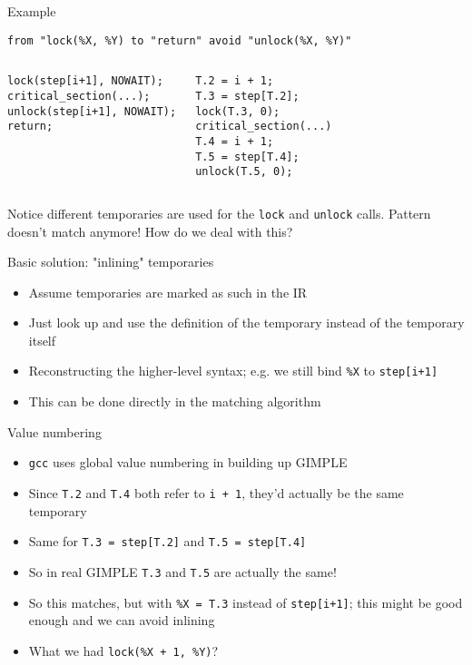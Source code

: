 \documentclass{beamer}
\begin{document}
\begin{frame}[fragile]{Example}

{\tt from "lock(\%X, \%Y) to "return" avoid "unlock(\%X, \%Y)"}

\begin{columns}
\column{2in}
\begin{verbatim}
lock(step[i+1], NOWAIT);
critical_section(...);
unlock(step[i+1], NOWAIT);
return;
\end{verbatim}
\column{2in}
\begin{verbatim}
T.2 = i + 1;
T.3 = step[T.2];
lock(T.3, 0);
critical_section(...)
T.4 = i + 1;
T.5 = step[T.4];
unlock(T.5, 0);
\end{verbatim}
\end{columns}
\vspace{10mm}
Notice different temporaries are used for the {\tt lock} and {\tt unlock} calls. Pattern doesn't match anymore! How do we deal with this?
\end{frame} 

\begin{frame}{Basic solution: "inlining" temporaries}
\begin{itemize}
\item Assume temporaries are marked as such in the IR
\item Just look up and use the definition of the temporary instead of the
temporary itself
\item Reconstructing the higher-level syntax; e.g. we still bind {\tt \%X}
to {\tt step[i+1]}
\item This can be done directly in the matching algorithm
\end{itemize}
\end{frame}

\begin{frame}{Value numbering}
\begin{itemize}
\item {\tt gcc} uses global value numbering in building up GIMPLE
\item Since {\tt T.2} and {\tt T.4} both refer to {\tt i + 1}, they'd
actually be the same temporary
\item Same for {\tt T.3 = step[T.2]} and {\tt T.5 = step[T.4]}
\item So in real GIMPLE {\tt T.3} and {\tt T.5} are actually the same!
\item So this matches, but with {\tt \%X = T.3} instead of {\tt step[i+1]};
this might be good enough and we can avoid inlining
\item What we had {\tt lock(\%X + 1, \%Y)}?
\end{itemize}
\end{frame}
\end{document}
